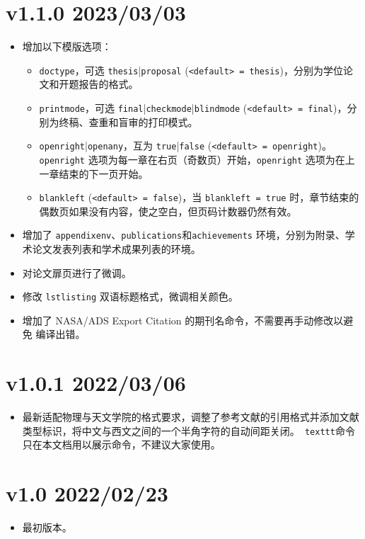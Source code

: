 \section*{v1.1.0 2023/03/03}
\begin{itemize}
    \item 增加以下模版选项：
    \begin{itemize}
        \item \texttt{doctype}，可选 \texttt{thesis}|\texttt{proposal} (\texttt{<default> = thesis})，分别为学位论文和开题报告的格式。
        \item \texttt{printmode}，可选 \texttt{final}|\texttt{checkmode}|\texttt{blindmode} (\texttt{<default> = final})，分别为终稿、查重和盲审的打印模式。
        \item \texttt{openright}|\texttt{openany}，互为 \texttt{true}|\texttt{false} (\texttt{<default> = openright})。\\ \texttt{openright} 选项为每一章在右页（奇数页）开始，\texttt{openright} 选项为在上一章结束的下一页开始。
        \item \texttt{blankleft} (\texttt{<default> = false})，当 \texttt{blankleft = true} 时，章节结束的偶数页如果没有内容，使之空白，但页码计数器仍然有效。
    \end{itemize}
    \item 增加了 \texttt{appendixenv}、\texttt{publications}和\texttt{achievements} 环境，分别为附录、学术论文发表列表和学术成果列表的环境。
    \item 对论文扉页进行了微调。
    \item 修改 \texttt{lstlisting} 双语标题格式，微调相关颜色。
    \item 增加了 NASA/ADS Export Citation 的期刊名命令，不需要再手动修改以避免  编译出错。
\end{itemize}

\section*{v1.0.1 2022/03/06}
\begin{itemize}
    \item 最新适配物理与天文学院的格式要求，调整了参考文献的引用格式并添加文献类型标识，将中文与西文之间的一个半角字符的自动间距关闭。\texttt{ texttt}命令只在本文档用以展示命令，不建议大家使用。
\end{itemize}

\section*{v1.0 2022/02/23}
\begin{itemize}
    \item 最初版本。
\end{itemize}